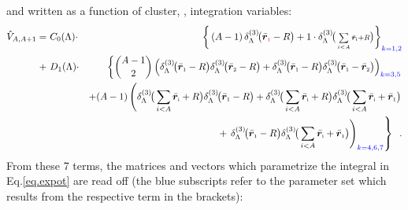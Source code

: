 \documentclass[aps,prd,onecolumn
,tightenlines,letterpaper,
notitlepage,11pt,linenumbers,
nofootinbib]{revtex4-1}
\begin{document}
and written as a function of cluster, \ie, integration variables:
\begin{eqnarray}
\hat{V}_{A,A+1}=&~C_0(\Lambda)\cdot&
\left\lbrace\,(A-1)\,\ddrei{\vcl{\red{1}}-R}+1\cdot
\ddrei{\scriptstyle \sum\limits_{i<A}\vcl{i}+R}\right\rbrace_{\blue{k=1,2}}\nonumber\\
+&~
D_1(\Lambda)\cdot&\left\lbrace{A-1\choose 2}\left(\ddrei{\vcl{1}-R}\ddrei{\vcl{2}-R}+
\ddrei{\vcl{1}-R}\ddrei{\vcl{1}-\vcl{2}}\right)_{\blue{k=3,5}}\right.\nonumber\\
&&+(A-1)\left(\ddrei{\sum\limits_{i<A}\vcl{i}+R}\ddrei{\vcl{1}-R}+\ddrei{\sum\limits_{i<A}\vcl{i}+R}\ddrei{\sum\limits_{i<A}\vcl{i}+\vcl{1}}\right.\nonumber\\
&&~\;\;\;\;\;\;\;\;\;\;\;\;\;+\left.\left.
\ddrei{\vcl{1}-R}\ddrei{\sum\limits_{i<A}\vcl{i}+\vcl{1}}\right)_{\blue{k=4,6,7}}\right\rbrace\;\;.
\end{eqnarray}
From these 7 terms, the matrices and vectors which parametrize the integral in
Eq.\eqref{eq.expot} are read off (the blue subscripts refer to the parameter set
which results from the respective term in the brackets):
%
\newpage
%
\arraycolsep=2.4pt\def\arraystretch{1.25}
\end{document}
